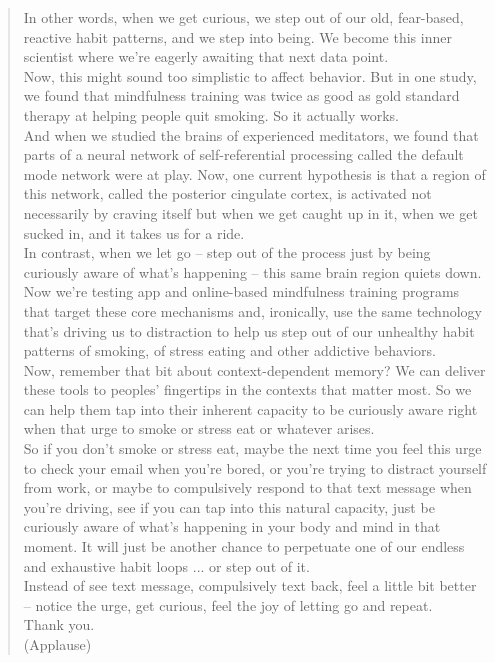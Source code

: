 \begin{quote}
In other words, when we get curious, we step out of our old, fear-based, reactive habit patterns, and we step into being. We become this inner scientist where we're eagerly awaiting that next data point.\\
Now, this might sound too simplistic to affect behavior. But in one study, we found that mindfulness training was twice as good as gold standard therapy at helping people quit smoking. So it actually works.\\
And when we studied the brains of experienced meditators, we found that parts of a neural network of self-referential processing called the default mode network were at play. Now, one current hypothesis is that a region of this network, called the posterior cingulate cortex, is activated not necessarily by craving itself but when we get caught up in it, when we get sucked in, and it takes us for a ride.\\
In contrast, when we let go -- step out of the process just by being curiously aware of what's happening -- this same brain region quiets down.\\
Now we're testing app and online-based mindfulness training programs that target these core mechanisms and, ironically, use the same technology that's driving us to distraction to help us step out of our unhealthy habit patterns of smoking, of stress eating and other addictive behaviors.\\
Now, remember that bit about context-dependent memory? We can deliver these tools to peoples' fingertips in the contexts that matter most. So we can help them tap into their inherent capacity to be curiously aware right when that urge to smoke or stress eat or whatever arises.\\
So if you don't smoke or stress eat, maybe the next time you feel this urge to check your email when you're bored, or you're trying to distract yourself from work, or maybe to compulsively respond to that text message when you're driving, see if you can tap into this natural capacity, just be curiously aware of what's happening in your body and mind in that moment. It will just be another chance to perpetuate one of our endless and exhaustive habit loops ... or step out of it.\\
Instead of see text message, compulsively text back, feel a little bit better -- notice the urge, get curious, feel the joy of letting go and repeat.\\
Thank you.\\
(Applause)\\
\end{quote}

